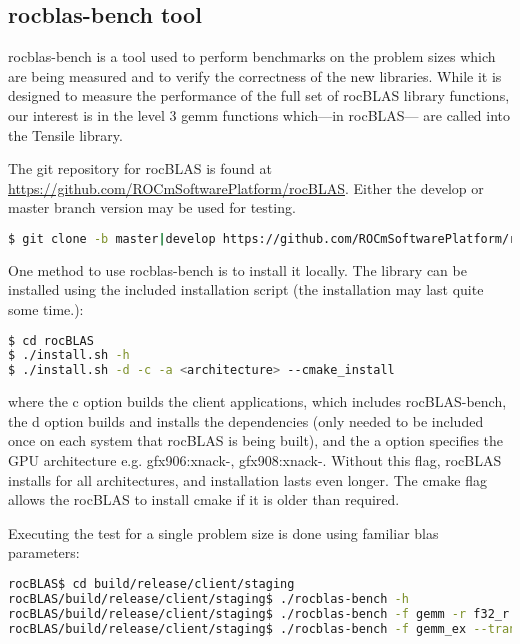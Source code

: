 \documentclass[]{article}
\begin{document}
\subsection{rocblas-bench tool}

\label{sec:bench}

\noindent
rocblas-bench is a tool used to perform benchmarks on the problem sizes which are being measured and to verify the correctness of the new libraries. While it is designed to measure the performance of the full set of rocBLAS library functions, our interest is in the level 3 gemm functions which---in rocBLAS--- are called into the Tensile library.


The git repository for rocBLAS is found at \url{https://github.com/ROCmSoftwarePlatform/rocBLAS}. Either the develop or master branch version may be used for testing.

\begin{lstlisting}[language=bash]
$ git clone -b master|develop https://github.com/ROCmSoftwarePlatform/rocBLAS.git
\end{lstlisting}

One method to use rocblas-bench is to install it locally. The library can be installed using the included installation script (the installation may last quite some time.):

\begin{lstlisting}[language=bash]
$ cd rocBLAS
$ ./install.sh -h
$ ./install.sh -d -c -a <architecture> --cmake_install
\end{lstlisting}

\noindent
where the c option builds the client applications, which includes rocBLAS-bench, the d option builds and installs the dependencies (only needed to be included once on each system that rocBLAS is being built), and the a option specifies the GPU architecture e.g. gfx906:xnack-, gfx908:xnack-. Without this flag, rocBLAS installs for all architectures, and installation lasts even longer. The cmake flag allows the rocBLAS to install cmake if it is older than required.

\noindent
Executing the test for a single problem size is done using familiar blas parameters:

\begin{lstlisting}[language=bash]
rocBLAS$ cd build/release/client/staging
rocBLAS/build/release/client/staging$ ./rocblas-bench -h
rocBLAS/build/release/client/staging$ ./rocblas-bench -f gemm -r f32_r --transposeA N --transposeB T -m 1001 -n 1536 -k 64 --alpha 1.0 --lda 1001 --ldb 1536 --beta 0.0 --ldc 1001 -i 10
rocBLAS/build/release/client/staging$ ./rocblas-bench -f gemm_ex --transposeA N --transposeB T -m 1024 -n 1024-k 1024 --a_type h --lda 2048 --b_type h --ldb 2048 --beta 1 --c_type s --ldc 2048 --d_type s --ldd 2048 --compute_type s -v 1 --iters 10 --cold_iters 2
\end{lstlisting}
\end{document}

